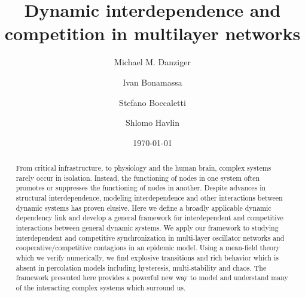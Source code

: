 \documentclass[pre,twocolumn,superscriptaddress]{revtex4}
\newcommand{\1}{\mathds{1}}
\begin{document}
\title{Dynamic interdependence and competition in multilayer networks}

\author{Michael M. Danziger}

\author{Ivan Bonamassa}

\author{Stefano Boccaletti}

\author{Shlomo Havlin}

\date{\today}
\begin{abstract}
From critical infrastructure, to physiology and the human brain, complex systems rarely occur in isolation.  
Instead, the functioning of nodes in one system often promotes or suppresses the functioning of nodes in another.
Despite advances in structural interdependence, modeling interdependence and other interactions between dynamic systems has proven elusive. 
Here we define a broadly applicable dynamic dependency link and develop a general framework for interdependent and competitive interactions between general dynamic systems.
We apply our framework to studying interdependent and competitive synchronization in multi-layer oscillator networks and cooperative/competitive contagions in an epidemic model.
Using a mean-field theory which we verify numerically, we find explosive transitions and rich behavior which is absent in percolation models including hysteresis, multi-stability and chaos. 
The framework presented here provides a powerful new way to model and understand many of the interacting complex systems which surround us.
\end{abstract}

\maketitle
\end{document}
